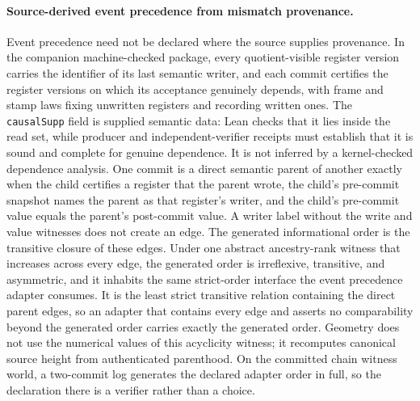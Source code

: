 \documentclass[11pt]{article}
\theoremstyle{remark}
\theoremstyle{plain}
\begin{document}
\paragraph{Source-derived event precedence from mismatch provenance.}
Event precedence need not be declared where the source supplies
provenance.  In the companion machine-checked package, every
quotient-visible register version carries the identifier of its last
semantic writer, and each commit certifies the register versions on which
its acceptance genuinely depends, with frame and stamp laws fixing
unwritten registers and recording written ones. The \texttt{causalSupp}
field is supplied semantic data: Lean checks that it lies inside the read
set, while producer and independent-verifier receipts must establish that it
is sound and complete for genuine dependence. It is not inferred by a
kernel-checked dependence analysis. One commit is a direct
semantic parent of another exactly when the child certifies a register that
the parent wrote, the child's pre-commit snapshot names the parent as that
register's writer, and the child's pre-commit value equals the parent's
post-commit value. A writer label without the write and value witnesses does
not create an edge.
The generated informational order is the transitive closure of these edges.
Under one abstract ancestry-rank witness that increases across every edge, the generated order is
irreflexive, transitive, and asymmetric, and it inhabits the same
strict-order interface the event precedence adapter consumes.  It is the
least strict transitive relation containing the direct parent edges, so
an adapter that contains every edge and asserts no comparability beyond
the generated order carries exactly the generated order. Geometry does not
use the numerical values of this acyclicity witness; it recomputes canonical
source height from authenticated parenthood. On the
committed chain witness world, a two-commit log generates the declared
adapter order in full, so the declaration there is a verifier rather than
a choice.
\end{document}

